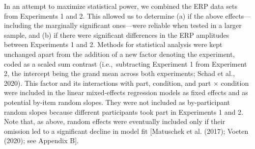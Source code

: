 \documentclass[
  english,
  man,floatsintext]{apa7}
\begin{document}
In an attempt to maximize statistical power, we combined the ERP data sets from Experiments 1 and 2. This allowed us to determine (a) if the above effects---including the marginally significant ones---were reliable when tested in a larger sample, and (b) if there were significant differences in the ERP amplitudes between Experiments 1 and 2. Methods for statistical analysis were kept unchanged apart from the addition of a new factor denoting the experiment, coded as a scaled sum contrast (i.e.,~subtracting Experiment 1 from Experiment 2, the intercept being the grand mean across both experiments; Schad et al., 2020). This factor and its interactions with part, condition, and part × condition were included in the linear mixed-effects regression models as fixed effects and as potential by-item random slopes. They were not included as by-participant random slopes because different participants took part in Experiments 1 and 2. Note that, as above, random effects were eventually included only if their omission led to a significant decline in model fit {[}Matuschek et al. (2017); Voeten (2020); see Appendix B{]}.
\end{document}
